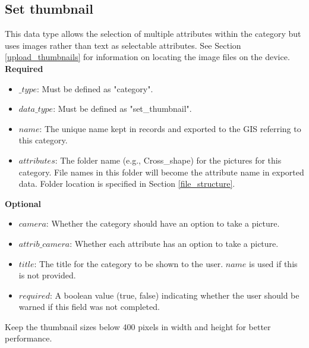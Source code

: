 \documentclass{scrreprt}
\begin{document}
\subsection{Set thumbnail}
\label{dt_thumbnails}
This data type allows the selection of multiple attributes within the category but uses images rather than text as selectable attributes. See Section \ref{upload_thumbnails} for information on locating the image files on the device.\\
\textbf{Required}
\begin{itemize}
\item $\_type$:  Must be defined as "category".
\item $data\_type$: Must be defined as "set_thumbnail".
\item $name$: The unique name kept in records and exported to the GIS referring to this category.
\item $attributes$: The folder name (e.g., Cross_shape) for the pictures for this category. File names in this folder will become the attribute name in exported data. Folder location is specified in Section \ref{file_structure}.
\end{itemize}
\textbf{Optional}
\begin{itemize}
\item $camera$: Whether the category should have an option to take a picture.
\item $attrib\_camera$: Whether each attribute has an option to take a picture.
\item $title$: The title for the category to be shown to the user. $name$ is used if this is not provided.
\item $required$: A boolean value (true, false) indicating whether the user should be warned if this field was not completed.
\end{itemize}
Keep the thumbnail sizes below 400 pixels in width and height for better performance.

\newpage
\end{document}
